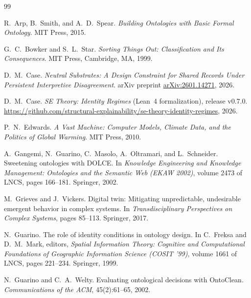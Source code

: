 \documentclass[11pt]{article}
\theoremstyle{plain}
\theoremstyle{definition}
\theoremstyle{remark}
\begin{document}
\begin{thebibliography}{99}
  \small

  R.\ Arp, B.\ Smith, and A.\ D.\ Spear.
  \emph{Building Ontologies with Basic Formal Ontology}.
  MIT Press, 2015.

  G.\ C.\ Bowker and S.\ L.\ Star.
  \emph{Sorting Things Out: Classification and Its Consequences}.
  MIT Press, Cambridge, MA, 1999.

  D.\ M.\ Case.
  \emph{Neutral Substrates: A Design Constraint for Shared Records Under Persistent Interpretive Disagreement}.
  arXiv preprint \href{https://arxiv.org/abs/2601.14271}{arXiv:2601.14271}, 2026.

  D.\ M.\ Case.
  \emph{SE Theory: Identity Regimes} (Lean~4 formalization), release v0.7.0.
  \url{https://github.com/structural-explainability/se-theory-identity-regimes}, 2026.

  P.\ N.\ Edwards.
  \emph{A Vast Machine: Computer Models, Climate Data, and the Politics of Global Warming}.
  MIT Press, 2010.

  A.\ Gangemi, N.\ Guarino, C.\ Masolo, A.\ Oltramari, and L.\ Schneider.
  Sweetening ontologies with DOLCE.
  In \emph{Knowledge Engineering and Knowledge Management: Ontologies and the Semantic Web (EKAW 2002)},
  volume 2473 of LNCS, pages 166--181.
  Springer, 2002.

  M.\ Grieves and J.\ Vickers.
  Digital twin: Mitigating unpredictable, undesirable emergent behavior in complex systems.
  In \emph{Transdisciplinary Perspectives on Complex Systems}, pages 85--113.
  Springer, 2017.

  N.\ Guarino.
  The role of identity conditions in ontology design.
  In C.\ Freksa and D.\ M.\ Mark, editors,
  \emph{Spatial Information Theory: Cognitive and Computational Foundations of Geographic Information Science (COSIT '99)},
  volume 1661 of LNCS, pages 221--234.
  Springer, 1999.

  N.\ Guarino and C.\ A.\ Welty.
  Evaluating ontological decisions with OntoClean.
  \emph{Communications of the ACM}, 45(2):61--65, 2002.


\end{thebibliography}
\end{document}
